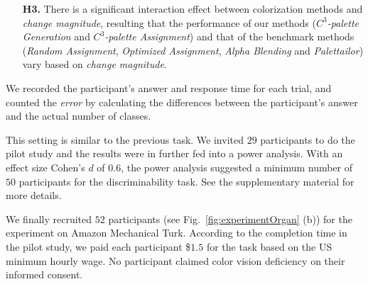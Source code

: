 {\begin{itemize}[noitemsep]
    \item [\textbf{H3.}] There is a significant interaction effect between colorization methods and \emph{change magnitude}, resulting that the performance of our methods (\emph{$C^3$-palette Generation} and \emph{$C^3$-palette Assignment}) and that of the benchmark methods (\emph{Random Assignment}, \emph{Optimized Assignment}, \emph{Alpha Blending} and \emph{Palettailor}) vary based on \emph{change magnitude}.
\end{itemize}

\vspace{.3em}
We recorded the participant's answer and response time for each trial, and counted the \emph{error}  by calculating the differences between the participant's answer and the actual number of classes.


\vspace{.3em}
This setting is similar to the previous task. We invited $29$ participants to do the pilot study and the results were in further fed into a power analysis. With an effect size Cohen's $d$ of $0.6$, the power analysis suggested a minimum number of $50$ participants for the discriminability task.  See the supplementary material for more details.

\vspace{.3em}
We finally recruited $52$ participants (see Fig.~\ref{fig:experimentOrgan} (b)) for the experiment on Amazon Mechanical Turk.
According to the completion time in the pilot study, we paid each participant \$$1.5$ for the task based on the US minimum hourly wage.
No participant claimed color vision deficiency on their informed consent.


}
